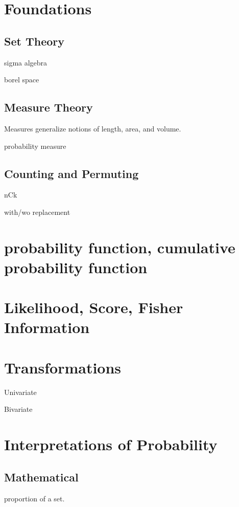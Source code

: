 \documentclass[]{article}
\begin{document}
\section{Foundations}\subsection{Set Theory}

sigma algebra

borel space

\subsection{Measure Theory}

Measures generalize notions of length, area, and volume.

probability measure

\subsection{Counting and Permuting}

nCk

with/wo replacement

\section{probability function, cumulative probability function}

\section{Likelihood, Score, Fisher Information}

\section{Transformations}

Univariate

Bivariate

\section{Interpretations of Probability}

\subsection{Mathematical}

proportion of a set.
\end{document}
